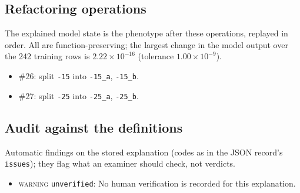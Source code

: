 \begin{drafted}
\subsection{Refactoring operations}\label{app:heart-s2-c2:operations}
The explained model state is the phenotype after these operations, replayed in order. All are function-preserving; the largest change in the model output over the 242 training rows is $2.22\times 10^{-16}$ (tolerance $1.00\times 10^{-9}$).
\begin{itemize}
\item \#26: split \texttt{-15} into \texttt{-15\_\allowbreak{}a}, \texttt{-15\_\allowbreak{}b}.
\item \#27: split \texttt{-25} into \texttt{-25\_\allowbreak{}a}, \texttt{-25\_\allowbreak{}b}.
\end{itemize}
\subsection{Audit against the definitions}\label{app:heart-s2-c2:audit}
Automatic findings on the stored explanation (codes as in the JSON record's \texttt{issues}); they flag what an examiner should check, not verdicts.
\begin{itemize}
\item \textsc{warning} \texttt{unverified}: No human verification is recorded for this explanation.
\end{itemize}
\end{drafted}
